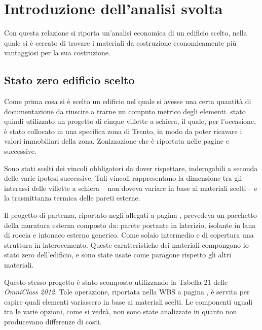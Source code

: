 \chapter{Introduzione dell'analisi svolta}
Con questa relazione si riporta un'analisi economica di un edificio scelto, nella quale si è cercato di trovare i materiali da costruzione economicamente più vantaggiosi per la sua costruzione.
\section{Stato zero edificio scelto}
Come prima cosa si è scelto un edificio nel quale si avesse una certa quantità di documentazione da riuscire a trarne un computo metrico degli elementi.
\e stato quindi utilizzato un progetto di cinque villette a schiera, il quale, per l'occasione, è stato collocato in una specifica zona di Trento, in modo da poter ricavare i valori immobiliari della zona. 
Zonizzazione che è riportata nelle pagine \pageref{Edificio} e successive.

Sono stati scelti dei vincoli obbligatori da dover rispettare, inderogabili a seconda delle varie ipotesi successive. 
Tali vincoli rappresentano la dimensione tra gli interassi delle villette a schiera -- non doveva variare in base ai materiali scelti -- e la trasmittanza termica delle pareti esterne. 

Il progetto di partenza, riportato negli allegati a pagina \pageref{piante}, prevedeva un pacchetto della muratura esterna composto da: parete portante in laterizio, isolante in lana di roccia e intonaco esterno generico. Come solaio intermedio e di copertura una struttura in laterocemento.
Queste caratteristiche dei materiali compongono lo stato zero dell'edificio, e sono state usate come paragone rispetto gli altri materiali.

Questo stesso progetto è stato scomposto utilizzando la Tabella 21 delle \emph{OmniClass 2012}. 
Tale operazione, riportata nella WBS a pagina \pageref{WBS}, è servita per capire quali elementi variassero in base ai materiali scelti.
Le componenti uguali tra le varie opzioni, come si vedrà, non sono state analizzate in quanto non producevano differenze di costi.
